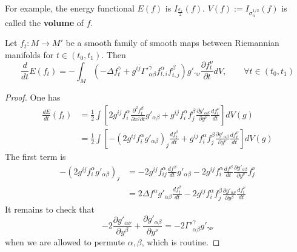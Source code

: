 \begin{exampl}
For example, the energy functional \(E(f)\) is \(I_\frac{\sigma_1}{2}(f)\). \(V(f):=I_{\sigma^{1/2}_n}(f)\) is called the \textbf{volume} of \(f\).
\end{exampl}

\begin{lemma}
\label{lem:var-energy}
Let \(f_t: M \longrightarrow M'\) be a smooth family of smooth maps between Riemannian
manifolds for \(t\in (t_0,t_1)\). Then
\[
\frac{d}{dt}E(f_t) = -\int_M \left(-\Delta f_t^\gamma +g^{ij}\Gamma'^{\gamma}_{\alpha\beta}
f^{\alpha}_{t,i}f^{\beta}_{t,j}\right) g'_{\gamma\nu} \frac{\partial f_t^\nu}{\partial
t}dV,\qquad \forall t\in (t_0,t_1)
\]
\end{lemma}
\begin{proof}
One has 
\begin{align*}
   \frac{dE}{dt}(f_t) &= \frac{1}{2}\int \left[ 2g^{ij}  f^\alpha_i \frac{\partial^2 f_t^\beta}{\partial x^j
\partial t} g'_{\alpha\beta}   + g^{ij}f^\alpha_i f^\beta_j \frac{\partial g'_{\alpha\beta}}{\partial y^\nu} \frac{d f^\nu_t}{d t}  \right] dV(g) \\
	 &=\frac{1}{2}\int \left[ -\left(2g^{ij}  f^\alpha_i g'_{\alpha\beta}\right)_j \frac{d f_t^\beta}{
d t}   + g^{ij}f^\alpha_i f^\beta_j \frac{\partial g'_{\alpha\beta}}{\partial y^\nu} \frac{d f^\nu_t}{d t} \right] dV(g)
\end{align*}
The first term is
\begin{align*}
   -\left(2g^{ij}  f^\alpha_i g'_{\alpha\beta}\right)_j &= -2 g^{ij}f^\alpha_{ij}
\frac{d f^\beta}{d t}g'_{\alpha\beta} - 2 g^{ij}f^\alpha_i
\frac{d f^\beta}{d t}\frac{\partial g'_{\alpha\beta}}{\partial y^\nu} f^\nu_j\\
&= 2\Delta f^\alpha g'_{\alpha\beta} \frac{d f_t^\beta}{d t} - 2 g^{ij}f^\alpha_i f^\beta_j \frac{\partial g'_{\alpha\nu}}{\partial y^\beta} \frac{d f_t^\nu}{dt}
\end{align*}
It remains to check that 
\[
-2\frac{\partial g'_{\alpha\nu}}{\partial y^\beta} + \frac{\partial
g'_{\alpha\beta}}{\partial y^\nu} = -2 \Gamma'^\gamma_{\alpha\beta}g'_{\gamma\nu}
\]
when we are allowed to permute \(\alpha,\beta\), which is routine.
\end{proof}

